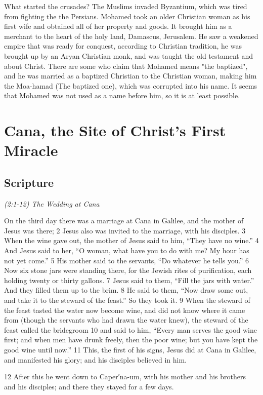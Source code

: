 \documentclass[letterpaper]{report}
\begin{document}
What started the crusades?
The Muslims invaded Byzantium, which was tired from fighting the the Persians.
Mohamed took an older Christian woman as his first wife and obtained all of her property and goods. It brought him as a merchant to the heart of the holy land, Damascus, Jerusalem.  He saw a weakened empire that was ready for conquest, according to Christian tradition, he was brought up by an Aryan Christian monk, and was taught the old testament and about Christ. There are some who claim that Mohamed means "the baptized", and he was married as a baptized Christian to the Christian woman, making him the  Moa-hamad (The baptized one), which was corrupted into his name. It seems that Mohamed was not used as a name before him, so it is at least possible.


\clearpage
\section{Cana, the Site of Christ's First Miracle}
\begin{multicols}{2}
	\mbox{}
\end{multicols}
\subsection{Scripture}

{\centering
	\emph{(2:1-12) The Wedding at Cana}\\
}
\begin{multicols}{2}
On the third day there was a marriage at Cana in Galilee, and the mother of Jesus was there; 2 Jesus also was invited to the marriage, with his disciples. 3 When the wine gave out, the mother of Jesus said to him, “They have no wine.” 4 And Jesus said to her, “O woman, what have you to do with me? My hour has not yet come.” 5 His mother said to the servants, “Do whatever he tells you.” 6 Now six stone jars were standing there, for the Jewish rites of purification, each holding twenty or thirty gallons. 7 Jesus said to them, “Fill the jars with water.” And they filled them up to the brim. 8 He said to them, “Now draw some out, and take it to the steward of the feast.” So they took it. 9 When the steward of the feast tasted the water now become wine, and did not know where it came from (though the servants who had drawn the water knew), the steward of the feast called the bridegroom 10 and said to him, “Every man serves the good wine first; and when men have drunk freely, then the poor wine; but you have kept the good wine until now.” 11 This, the first of his signs, Jesus did at Cana in Galilee, and manifested his glory; and his disciples believed in him.

12 After this he went down to Caper′na-um, with his mother and his brothers and his disciples; and there they stayed for a few days.
\end{multicols}
\end{document}
